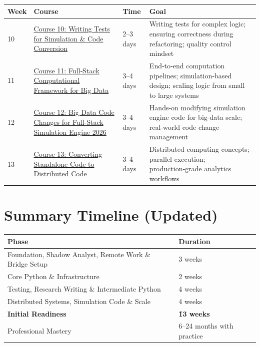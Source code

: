 \documentclass[12pt]{article}
\begin{document}
	\begin{tabularx}{\textwidth}{|X|p{3cm}|p{3cm}|X|}
		\hline
		\textbf{Week} & \textbf{Course} & \textbf{Time} & \textbf{Goal} \\
		\hline
		10 & \href{https://www.udemy.com/course/writing-tests-for-simeng-python-code-conversion-concepts-101/}{Course 10: Writing Tests for Simulation \& Code Conversion} & 2–3 days & Writing tests for complex logic; ensuring correctness during refactoring; quality control mindset \\
		\hline
		11 & \href{https://www.udemy.com/course/full-stack-computational-framework-for-big-data-simulations/}{Course 11: Full‑Stack Computational Framework for Big Data} & 3–4 days & End‑to‑end computation pipelines; simulation‑based design; scaling logic from small to large systems \\
		\hline
		12 & \href{https://www.udemy.com/course/big-data-code-changes-for-full-stack-simulation-engine-2026/}{Course 12: Big Data Code Changes for Full-Stack Simulation Engine 2026} & 3–4 days & Hands-on modifying simulation engine code for big-data scale; real-world code change management \\
		\hline
		13 & \href{https://www.udemy.com/course/converting-standalone-code-to-distributed-code-for-analytics/}{Course 13: Converting Standalone Code to Distributed Code} & 3–4 days & Distributed computing concepts; parallel execution; production‑grade analytics workflows \\
		\hline
	\end{tabularx}
	
	\newpage
	
	\section*{Summary Timeline (Updated)}
	
	\begin{tabularx}{\textwidth}{|l|X|}
		\hline
		\textbf{Phase} & \textbf{Duration} \\
		\hline
		Foundation, Shadow Analyst, Remote Work \& Bridge Setup & 3 weeks \\
		\hline
		Core Python \& Infrastructure & 2 weeks \\
		\hline
		Testing, Research Writing \& Intermediate Python & 4 weeks \\
		\hline
		Distributed Systems, Simulation Code \& Scale & 4 weeks \\
		\hline
		\textbf{Initial Readiness} & \textbf{\~13 weeks} \\
		\hline
		Professional Mastery & 6–24 months with practice \\
		\hline
	\end{tabularx}
	
\end{document}
